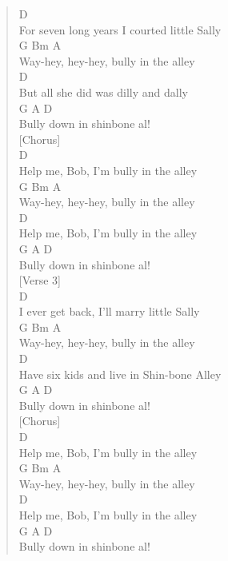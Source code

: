 \documentclass[11pt]{article}
\begin{document}
\begin{verse}
D\\
For seven long years I courted little Sally\\
G        Bm       A\\
Way-hey, hey-hey, bully in the alley\\
D\\
But all she did was dilly and dally\\
G             A        D\\
Bully down in shinbone al!\\
\vspace*{1em}
[Chorus]\\
D\\
Help me, Bob, I'm bully in the alley\\
G        Bm       A\\
Way-hey, hey-hey, bully in the alley\\
D\\
Help me, Bob, I'm bully in the alley\\
G             A        D\\
Bully down in shinbone al!\\
\vspace*{1em}
[Verse 3]\\
D\\
I ever get back, I'll marry little Sally\\
G        Bm       A\\
Way-hey, hey-hey, bully in the alley\\
D\\
Have six kids and live in Shin-bone Alley\\
G             A        D\\
Bully down in shinbone al!\\
\vspace*{1em}
[Chorus]\\
D\\
Help me, Bob, I'm bully in the alley\\
G        Bm       A\\
Way-hey, hey-hey, bully in the alley\\
D\\
Help me, Bob, I'm bully in the alley\\
G             A        D\\
Bully down in shinbone al!\\
\end{verse}
\clearpage
\end{document}
